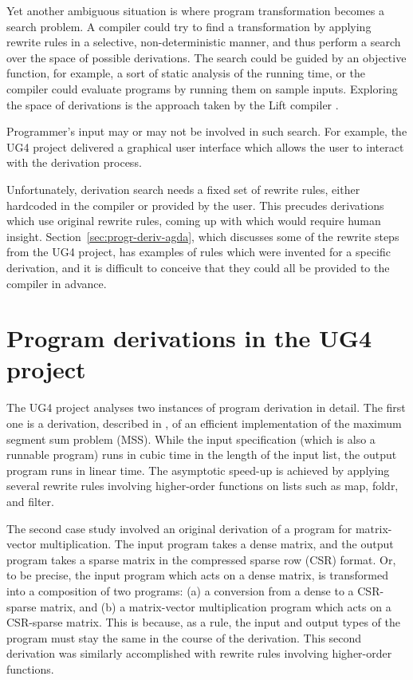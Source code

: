 \documentclass[bsc,frontabs,oneside,singlespacing,parskip,deptreport]{infthesis}
\theoremstyle{definition}
\theoremstyle{lemma}
\begin{document}
Yet another ambiguous situation is where program transformation
becomes a search problem. A compiler could try to find a
transformation by applying rewrite rules in a selective,
non-deterministic manner, and thus perform a search over the space of
possible derivations. The search could be guided by an objective
function, for example, a sort of static analysis of the running time,
or the compiler could evaluate programs by running them on sample
inputs. Exploring the space of derivations is the approach taken by
the Lift compiler \cite{TODO}.

Programmer's input may or may not be involved in such search. For
example, the UG4 project delivered a graphical user interface which
allows the user to interact with the derivation process.

Unfortunately, derivation search needs a fixed set of rewrite rules,
either hardcoded in the compiler or provided by the user. This
precudes derivations which use original rewrite rules, coming up with
which would require human insight. Section~\ref{sec:progr-deriv-agda},
which discusses some of the rewrite steps from the UG4 project, has
examples of rules which were invented for a specific derivation, and
it is difficult to conceive that they could all be provided to the
compiler in advance.

\section{Program derivations in the UG4 project}
\label{sec:progr-deriv-ug4}

The UG4 project analyses two instances of program derivation in
detail. The first one is a derivation, described in
\cite{gibbons1994introduction}, of an efficient implementation of the
maximum segment sum problem (MSS). While the input specification
(which is also a runnable program) runs in cubic time in the length of
the input list, the output program runs in linear time. The asymptotic
speed-up is achieved by applying several rewrite rules involving
higher-order functions on lists such as map, foldr, and filter.

The second case study involved an original derivation of a program for
matrix-vector multiplication. The input program takes a dense matrix,
and the output program takes a sparse matrix in the compressed sparse
row (CSR) format. Or, to be precise, the input program which acts on a
dense matrix, is transformed into a composition of two programs: (a) a
conversion from a dense to a CSR-sparse matrix, and (b) a
matrix-vector multiplication program which acts on a CSR-sparse
matrix. This is because, as a rule, the input and output types of the
program must stay the same in the course of the derivation. This
second derivation was similarly accomplished with rewrite rules
involving higher-order functions.
\end{document}
